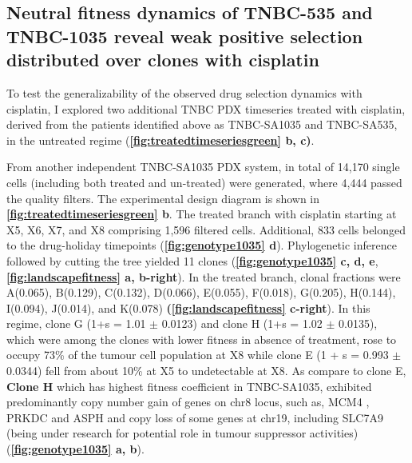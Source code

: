 
\subsection{Neutral fitness dynamics of TNBC-535 and TNBC-1035 reveal weak positive selection distributed over clones with cisplatin}
To test the generalizability of the observed drug selection dynamics with cisplatin, I explored two additional TNBC PDX timeseries treated with cisplatin, derived from the patients identified above as TNBC-SA1035 and TNBC-SA535, in the untreated regime  (\textbf{\autoref{fig:treatedtimeseriesgreen} b, c)}. 



From another independent TNBC-SA1035 PDX system, in total of 14,170 single cells (including both treated and un-treated) were generated, where 4,444 passed the quality filters. The experimental design diagram is shown in \textbf{\autoref{fig:treatedtimeseriesgreen} b}.
 The treated branch with cisplatin starting at X5, X6, X7, and X8 comprising 1,596 filtered cells. Additional, 833 cells belonged to the drug-holiday timepoints (\textbf{\autoref{fig:genotype1035} d}). Phylogenetic inference followed by cutting the tree yielded 11 clones (\textbf{\autoref{fig:genotype1035} c, d, e}, \textbf{\autoref{fig:landscapefitness} a, b-right}). In the treated branch, clonal fractions were A(0.065), B(0.129), C(0.132), D(0.066), E(0.055), F(0.018), G(0.205), H(0.144), I(0.094), J(0.014), and K(0.078) \textbf{(\autoref{fig:landscapefitness} c-right}). In this regime, clone G (1+s = 1.01 $\pm$ 0.0123) and clone H (1+s = 1.02 $\pm$ 0.0135), which were among the clones with lower fitness in absence of treatment, rose to occupy 73\% of the tumour cell population at X8 while clone E (1 + s = 0.993 $\pm$ 0.0344) fell from about 10\% at X5 to undetectable at X8. As compare to clone E,
 \textbf{Clone H} which has highest fitness coefficient in TNBC-SA1035, exhibited predominantly copy number gain of genes on chr8 locus, such as, MCM4 \cite {issac2019mcm2, stoeber2001dna, kwok2015prognostic}, PRKDC \cite {tan2020prkdc, sun2017prkdc, zhang2019prkdc} and ASPH and copy loss of some genes at chr19, including SLC7A9 (being under research for potential role in tumour suppressor activities) \cite {bhutia2016slc, ji2018function, broer2020amino, ganapathy2015slc5a8, gupta2006slc5a8} (\textbf{\autoref{fig:genotype1035} a, b}).
 
